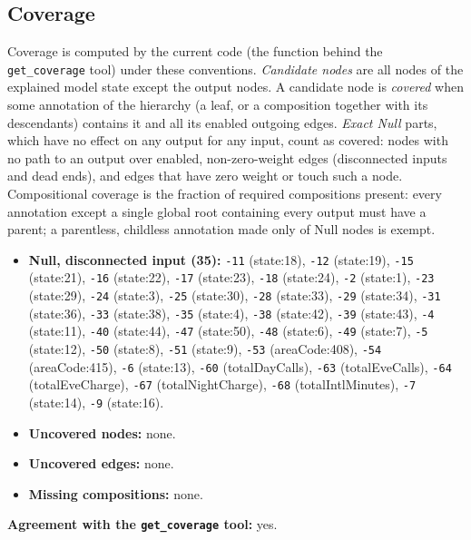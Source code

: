 \begin{drafted}
\subsection{Coverage}\label{app:churn100-s7-c1:coverage}
Coverage is computed by the current code (the function behind the \texttt{get\_coverage} tool) under these conventions. \emph{Candidate nodes} are all nodes of the explained model state except the output nodes. A candidate node is \emph{covered} when some annotation of the hierarchy (a leaf, or a composition together with its descendants) contains it and all its enabled outgoing edges. \emph{Exact Null} parts, which have no effect on any output for any input, count as covered: nodes with no path to an output over enabled, non-zero-weight edges (disconnected inputs and dead ends), and edges that have zero weight or touch such a node. Compositional coverage is the fraction of required compositions present: every annotation except a single global root containing every output must have a parent; a parentless, childless annotation made only of Null nodes is exempt.

\begin{itemize}
\item \textbf{Null, disconnected input (35):} \texttt{-11} (state:18), \texttt{-12} (state:19), \texttt{-15} (state:21), \texttt{-16} (state:22), \texttt{-17} (state:23), \texttt{-18} (state:24), \texttt{-2} (state:1), \texttt{-23} (state:29), \texttt{-24} (state:3), \texttt{-25} (state:30), \texttt{-28} (state:33), \texttt{-29} (state:34), \texttt{-31} (state:36), \texttt{-33} (state:38), \texttt{-35} (state:4), \texttt{-38} (state:42), \texttt{-39} (state:43), \texttt{-4} (state:11), \texttt{-40} (state:44), \texttt{-47} (state:50), \texttt{-48} (state:6), \texttt{-49} (state:7), \texttt{-5} (state:12), \texttt{-50} (state:8), \texttt{-51} (state:9), \texttt{-53} (areaCode:408), \texttt{-54} (areaCode:415), \texttt{-6} (state:13), \texttt{-60} (totalDayCalls), \texttt{-63} (totalEveCalls), \texttt{-64} (totalEveCharge), \texttt{-67} (totalNightCharge), \texttt{-68} (totalIntlMinutes), \texttt{-7} (state:14), \texttt{-9} (state:16).
\item \textbf{Uncovered nodes:} none.
\item \textbf{Uncovered edges:} none.
\item \textbf{Missing compositions:} none.
\end{itemize}
\noindent\textbf{Agreement with the \texttt{get\_coverage} tool:} yes.


\end{drafted}
